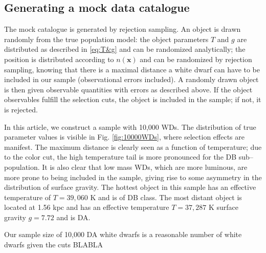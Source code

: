 \documentclass[fleqn,usenatbib]{mnras}
\newcommand{\Teff}{T}
\newcommand{\logg}{g}
\begin{document}
\subsection{Generating a mock data catalogue}

The mock catalogue is generated by rejection sampling. An object is drawn randomly from the true population model: the object parameters $\Teff$ and $\logg$ are distributed as described in \eqref{eq:T&g} and can be randomized analytically; the position is distributed according to $n(\mathbf{x})$ and can be randomized by rejection sampling, knowing that there is a maximal distance a white dwarf can have to be included in our sample (observational errors included). A randomly drawn object is then given observable quantities with errors as described above. If the object observables fulfill the selection cuts, the object is included in the sample; if not, it is rejected.

In this article, we construct a sample with 10,000 WDs. The distribution of true parameter values is visible in Fig. \ref{fig:10000WDs}, where selection effects are manifest. The maximum distance is clearly seen as a function of temperature; due to the color cut, the high temperature tail is more pronounced for the DB sub--population. It is also clear that low mass WDs, which are more luminous, are more prone to being included in the sample, giving rise to some asymmetry in the distribution of surface gravity. The hottest object in this sample has an effective temperature of $\Teff=39,060$ K and is of DB class. The most distant object is located at 1.56 kpc and has an effective temperature $\Teff=37,287$ K surface gravity $\logg=7.72$ and is DA.

Our sample size of 10,000 DA white dwarfs is a reasonable number of white dwarfs given the cuts BLABLA
\end{document}
